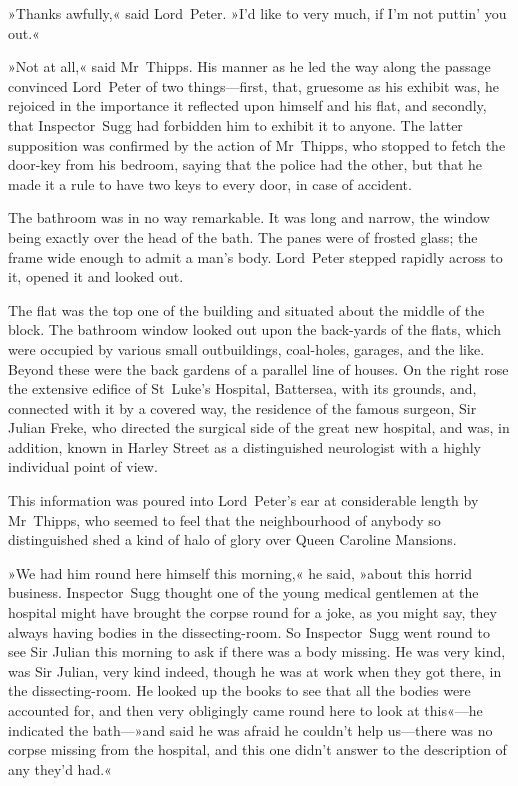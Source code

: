 »Thanks awfully,« said Lord~Peter. »I'd like to very much, if I'm not puttin' you out.«

»Not at all,« said Mr~Thipps. His manner as he led the way along the passage convinced Lord~Peter of two things—first, that, gruesome as his exhibit was, he rejoiced in the importance it reflected upon himself and his flat, and secondly, that Inspector~Sugg had forbidden him to exhibit it to anyone. The latter supposition was confirmed by the action of Mr~Thipps, who stopped to fetch the door-key from his bedroom, saying that the police had the other, but that he made it a rule to have two keys to every door, in case of accident.

The bathroom was in no way remarkable. It was long and narrow, the window being exactly over the head of the bath. The panes were of frosted glass; the frame wide enough to admit a man's body. Lord~Peter stepped rapidly across to it, opened it and looked out.

The flat was the top one of the building and situated about the middle of the block. The bathroom window looked out upon the back-yards of the flats, which were occupied by various small outbuildings, coal-holes, garages, and the like. Beyond these were the back gardens of a parallel line of houses. On the right rose the extensive edifice of St~Luke's Hospital, Battersea, with its grounds, and, connected with it by a covered way, the residence of the famous surgeon, Sir Julian Freke, who directed the surgical side of the great new hospital, and was, in addition, known in Harley Street as a distinguished neurologist with a highly individual point of view.

This information was poured into Lord~Peter's ear at considerable length by Mr~Thipps, who seemed to feel that the neighbourhood of anybody so distinguished shed a kind of halo of glory over Queen Caroline Mansions.

»We had him round here himself this morning,« he said, »about this horrid business. Inspector~Sugg thought one of the young medical gentlemen at the hospital might have brought the corpse round for a joke, as you might say, they always having bodies in the dissecting-room. So Inspector~Sugg went round to see Sir Julian this morning to ask if there was a body missing. He was very kind, was Sir Julian, very kind indeed, though he was at work when they got there, in the dissecting-room. He looked up the books to see that all the bodies were accounted for, and then very obligingly came round here to look at this«---he indicated the bath---»and said he was afraid he couldn't help us—there was no corpse missing from the hospital, and this one didn't answer to the description of any they'd had.«


